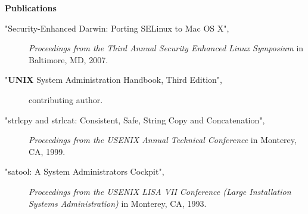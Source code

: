 \documentclass[letterpaper,11pt]{article}
\newcommand{\resheading}[1]{{\large \colorbox{mygrey}{\begin{minipage}{\textwidth}{\textbf{#1 \vphantom{p\^{E}}}}\end{minipage}}}}
\begin{document}
\resheading{Publications}

\begin{description}
\item["Security-Enhanced Darwin: Porting SELinux to Mac OS X",]
\emph{Proceedings from the Third Annual Security Enhanced Linux Symposium} in Baltimore, MD, 2007.
\item["{\sc \bf UNIX} System Administration Handbook, Third Edition",]
contributing author.
\item["strlcpy and strlcat:  Consistent, Safe, String Copy and Concatenation",]
\emph{Proceedings from the USENIX Annual Technical Conference} in Monterey, CA, 1999.
\item["satool:  A System Administrators Cockpit",]
\emph{Proceedings from the USENIX LISA VII Conference (Large Installation Systems Administration)} in Monterey, CA, 1993.
\end{description}
\end{document}

